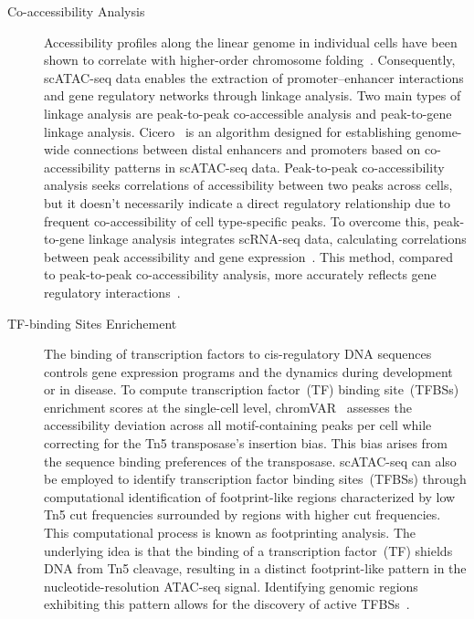 \begin{description}
	\item[Co-accessibility Analysis]
	Accessibility profiles along the linear genome in individual cells have been shown to correlate with higher-order chromosome folding~\citep{Buenrostro2015}. Consequently, scATAC-seq data enables the extraction of promoter–enhancer interactions and gene regulatory networks through linkage analysis. Two main types of linkage analysis are peak-to-peak co-accessible analysis and peak-to-gene linkage analysis. Cicero~\citep{pliner2018cicero} is an algorithm designed for establishing genome-wide connections between distal enhancers and promoters based on co-accessibility patterns in scATAC-seq data. Peak-to-peak co-accessibility analysis seeks correlations of accessibility between two peaks across cells, but it doesn't necessarily indicate a direct regulatory relationship due to frequent co-accessibility of cell type-specific peaks. To overcome this, peak-to-gene linkage analysis integrates scRNA-seq data, calculating correlations between peak accessibility and gene expression~\citep{Granja2021}. This method, compared to peak-to-peak co-accessibility analysis, more accurately reflects gene regulatory interactions~\citep{shi2022scatacoverview}.

	\item[TF-binding Sites Enrichement]
	The binding of transcription factors to cis-regulatory DNA sequences controls gene expression programs and the dynamics during development or in disease. To compute transcription factor~(TF) binding site~(TFBSs) enrichment scores at the single-cell level, chromVAR~\citep{schep2017chromvar} assesses the accessibility deviation across all motif-containing peaks per cell while correcting for the Tn5 transposase's insertion bias. This bias arises from the sequence binding preferences of the transposase. scATAC-seq can also be employed to identify transcription factor binding sites~(TFBSs) through computational identification of footprint-like regions characterized by low Tn5 cut frequencies surrounded by regions with higher cut frequencies. This computational process is known as footprinting analysis. The underlying idea is that the binding of a transcription factor~(TF) shields DNA from Tn5 cleavage, resulting in a distinct footprint-like pattern in the nucleotide-resolution ATAC-seq signal. Identifying genomic regions exhibiting this pattern allows for the discovery of active TFBSs~\citep{li2019hintatac}.

\end{description}

